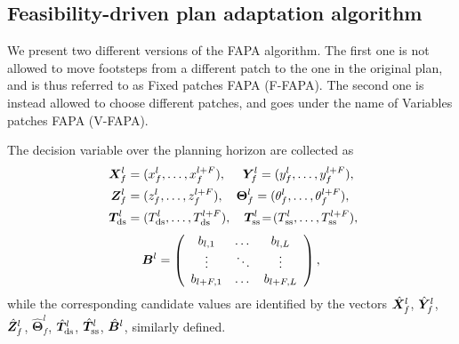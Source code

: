 \subsection{Feasibility-driven plan adaptation algorithm}
We present two different versions of the FAPA algorithm. The first one is not
allowed to move footsteps from a different patch to the one in the original
plan, and is thus referred to as Fixed patches FAPA (F-FAPA). The second one
is instead allowed to choose different patches, and goes under the name of
Variables patches FAPA (V-FAPA).

The decision variable over the planning horizon are collected as
\begin{align*}
    {\bm{X}}_f^l & =  (x_f^l,\dots,x_f^{l+F}), \quad 
    \,\, {\bm{Y}}_f^l  =  (y_f^l,\dots,y_f^{l+F}), \\
    \,\, {\bm{Z}}_f^l & = (z_f^l,\dots,z_f^{l+F}), \quad
    \bm{\Theta}_f^l = (\theta_f^l,\dots,\theta_f^{l+F}), \\
    \,\, {\bm{T}}_{\rm ds}^l & =  (T_{\rm ds}^l,\dots,T_{\rm ds}^{l+F}), \quad {\bm{T}}_{\rm ss}^l \!=\! (T_{\rm ss}^l,\dots,T_{\rm ss}^{l+F}), 
\end{align*}
\begin{equation*}
{\bm{B}}^l = \left(
\begin{array}{ccc}b_{l,1} & \dots & b_{l,L}\\ \vdots & \ddots & \vdots \\ b_{l+F,1} & \dots & b_{l+F,L} \end{array}
\right),
\end{equation*}
while the corresponding candidate values are identified by the vectors
$\hat {{\bm{X}}}_f^l$, $\hat {{\bm{Y}}}_f^l$, $\hat {{\bm{Z}}}_f^l$, $\hat {\bm{\Theta}}_f^l$, $\hat {{\bm{T}}}^l_{\rm ds}$, $\hat {{\bm{T}}}^l_{\rm ss}$, $\hat {{\bm{B}}}^l$, similarly defined.

